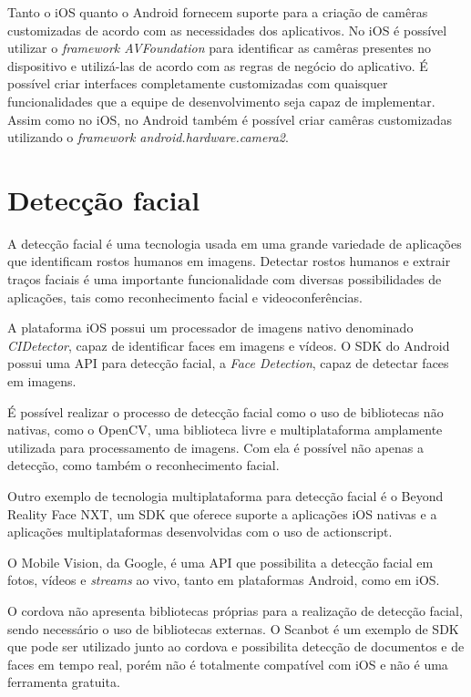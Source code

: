 Tanto o iOS quanto o Android fornecem suporte para a criação de camêras customizadas de acordo com as necessidades dos aplicativos. No iOS é possível utilizar o \textit{framework AVFoundation} para identificar as camêras 
presentes no dispositivo e utilizá-las de acordo com as regras de negócio do aplicativo. É possível criar interfaces completamente customizadas com quaisquer funcionalidades que a equipe de desenvolvimento seja capaz de 
implementar. Assim como no iOS, no Android também é possível criar camêras customizadas utilizando o \textit{framework android.hardware.camera2}.

\section{Detecção facial} \label{subsubsec:facial}
A detecção facial é uma tecnologia usada em uma grande variedade de aplicações que identificam
rostos humanos em imagens. Detectar rostos humanos e extrair traços faciais é uma importante funcionalidade
com diversas possibilidades de aplicações, tais como reconhecimento facial e videoconferências. %

A plataforma iOS possui um processador de imagens nativo denominado \textit{CIDetector}, capaz de identificar faces em imagens e vídeos.
O SDK do Android possui uma API para detecção facial, a \textit{Face Detection}, capaz de detectar faces em imagens.

É possível realizar o processo de detecção facial como o uso de bibliotecas não nativas, como o OpenCV, uma biblioteca livre 
e multiplataforma amplamente utilizada para processamento de imagens. Com ela é possível não apenas a detecção, como também
o reconhecimento facial.

Outro exemplo de tecnologia multiplataforma para detecção facial é o Beyond Reality Face NXT, um SDK que oferece suporte 
a aplicações iOS nativas e a aplicações multiplataformas desenvolvidas com o uso de actionscript.%

O Mobile Vision, da Google, é uma API que possibilita a detecção facial em fotos, vídeos e \textit{streams} ao vivo, 
tanto em plataformas Android, como em iOS.

O cordova não apresenta bibliotecas próprias para a realização de detecção facial, sendo necessário o uso de bibliotecas externas.
O Scanbot é um exemplo de SDK que pode ser utilizado junto ao cordova e possibilita detecção de documentos e de faces em tempo real,
 porém não é totalmente compatível com iOS e não é uma ferramenta gratuita. %

